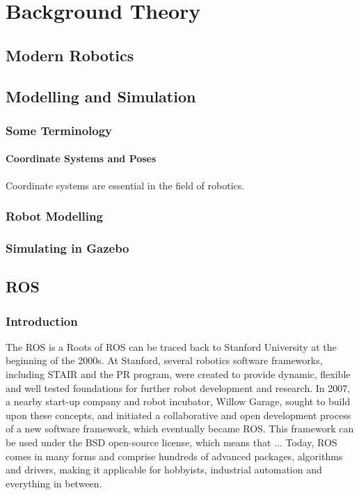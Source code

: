 \chapter{Background Theory}
\label{chp:theory} 


\section{Modern Robotics}

\section{Modelling and Simulation}

\subsection{Some Terminology}

\subsubsection{Coordinate Systems and Poses}

Coordinate systems are essential in the field of robotics. 

\subsection{Robot Modelling}

\subsection{Simulating in Gazebo}

\section{ROS}

\subsection{Introduction}

The \ac{ROS} is a 
Roots of \ac{ROS} can be traced back to Stanford University at the beginning of the 2000s. At Stanford, several robotics software frameworks, including \ac{STAIR} and the \ac{PR} program, were created to provide dynamic, flexible and well tested foundations for further robot development and research. In 2007, a nearby start-up company and robot incubator, Willow Garage, sought to build upon these concepts, and initiated a collaborative and open development process of a new software framework, which eventually became \ac{ROS}. This framework can be used under the BSD open-source license, which means that ... Today, \ac{ROS} comes in many forms and comprise hundreds of advanced packages, algorithms and drivers, making it applicable for hobbyists, industrial automation and everything in between. 

